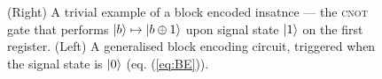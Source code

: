 \documentclass{article}
\begin{document}
\begin{figure}[h!]
    \centering
    \caption{(Right) A trivial example of a block encoded insatnce ---  the \textsc{cnot} gate that performs $\ket{b}\mapsto\ket{b\oplus 1}$ upon signal state $\ket{1}$ on the first register. (Left) A generalised block encoding circuit, triggered when the signal state is $\ket{0}$ (eq. (\ref{eq:BE})).}
    \label{fig:BE_diagram}
\end{figure}
\end{document}
